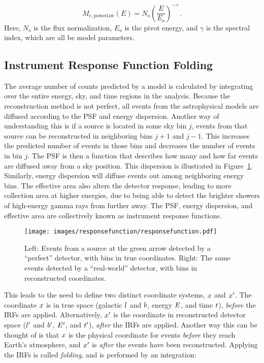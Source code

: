 \begin{equation}\label{eqn:powerlaw_Me}
  M_{e,\textrm{powerlaw}}(E) = N_o \left ( \frac{E}{E_o} \right )^{-\gamma} \,.
\end{equation}
Here, $N_o$ is the flux normalization, $E_o$ is the pivot energy, and $\gamma$ is the spectral index, which are all be model parameters.


\subsection{Instrument Response Function Folding}\label{subsec:folding}
The average number of counts predicted by a model is calculated by integrating over the entire energy, sky, and time regions in the analysis.
Because the reconstruction method is not perfect, all events from the astrophysical models are diffused according to the PSF and energy dispersion.
Another way of understanding this is if a source is located in some sky bin $j$, events from that source can be reconstructed in neighboring bins $j+1$ and $j-1$.
This increases the predicted number of events in those bins and decreases the number of events in bin $j$.
The PSF is then a function that describes how many and how far events are diffused away from a sky position.
This dispersion is illustrated in Figure~\ref{fig:responsedispersion}.
Similarly, energy dispersion will diffuse events out among neighboring energy bins.
The effective area also alters the detector response, leading to more collection area at higher energies, due to being able to detect the brighter showers of high-energy gamma rays from further away.
The PSF, energy dispersion, and effective area are collectively known as instrument response functions.

\begin{figure}[!t]
  \centering
  \texttt{[image: images/responsefunction/responsefunction.pdf]}
  \caption[Response Function Dispersion]
  {
    Left: Events from a source at the green arrow detected by a ``perfect'' detector, with bins in true coordinates.
    Right: The same events detected by a ``real-world'' detector, with bins in reconstructed coordinates.
  }
  \label{fig:responsedispersion}
\end{figure}

This leads to the need to define two distinct coordinate systems, $x$ and $x'$.
The coordinate $x$ is in true space (galactic $l$ and $b$, energy $E$, and time $t$), \textit{before} the IRFs are applied.
Alternatively, $x'$ is the coordinate in reconstructed detector space ($l'$ and $b'$, $E'$, and $t'$), \textit{after} the IRFs are applied.
Another way this can be thought of is that $x$ is the physical coordinate for events \textit{before} they reach Earth's atmosphere, and $x'$ is \textit{after} the events have been reconstructed.
Applying the IRFs is called \textit{folding}, and is performed by an integration:

